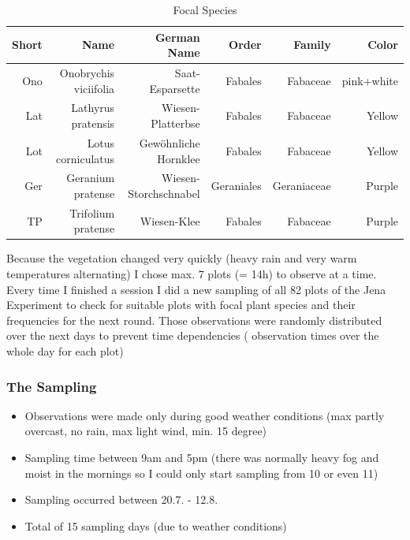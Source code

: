 \begin{table}[htbp]
  \centering
  \caption{Focal Species}
    \begin{tabular}{rrrrrr}
    \toprule
    \textbf{Short} & \textbf{Name} & \textbf{German Name} & \textbf{Order} & \textbf{Family} & \textbf{Color} \\
    \midrule
    Ono   & Onobrychis viciifolia & Saat-Esparsette & Fabales & Fabaceae & pink+white \\
    Lat   & Lathyrus pratensis & Wiesen-Platterbse & Fabales & Fabaceae & Yellow \\
    Lot   & Lotus corniculatus & Gewöhnliche Hornklee & Fabales & Fabaceae & Yellow \\
    Ger   & Geranium pratense & Wiesen-Storchschnabel & Geraniales & Geraniaceae & Purple \\
    TP    & Trifolium pratense & Wiesen-Klee & Fabales & Fabaceae & Purple \\
    \bottomrule
    \end{tabular}%
\end{table}%


Because the vegetation changed very quickly (heavy rain and very warm temperatures alternating) I chose max. 7 plots (= 14h) to observe at a time. 
Every time I finished a session I did a new sampling of all 82 plots of the Jena Experiment to check for suitable plots with focal plant species and their frequencies for the next round. Those observations were randomly distributed over the next days to prevent time dependencies ( observation times over the whole day for each plot)


\subsubsection{The Sampling}

\begin{itemize}
\item	Observations were made only during good weather conditions (max partly overcast, no rain, max light wind, min. 15 degree)
\item	Sampling time between 9am and 5pm (there was normally heavy fog and moist in the mornings so I could only start sampling from 10 or even 11)
\item	Sampling occurred between 20.7. -  12.8. 
\item Total of 15 sampling days (due to weather conditions)
\end{itemize}



